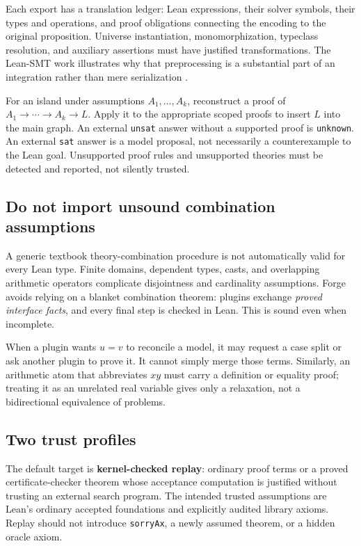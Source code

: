 \documentclass[11pt,a4paper]{article}
\newcommand{\code}[1]{\texttt{\small #1}}
\begin{document}
Each export has a translation ledger: Lean expressions, their solver symbols,
their types and operations, and proof obligations connecting the encoding to
the original proposition. Universe instantiation, monomorphization, typeclass
resolution, and auxiliary assertions must have justified transformations.
The Lean-SMT work illustrates why that preprocessing is a substantial part of
an integration rather than mere serialization \cite{lean-smt}.

For an island under assumptions $A_1,\ldots,A_k$, reconstruct a proof of
$A_1\to\cdots\to A_k\to L$. Apply it to the appropriate scoped proofs to
insert $L$ into the main graph. An external \code{unsat} answer without a
supported proof is \code{unknown}. An external \code{sat} answer is a model
proposal, not necessarily a counterexample to the Lean goal. Unsupported proof
rules and unsupported theories must be detected and reported, not silently
trusted.

\subsection{Do not import unsound combination assumptions}

A generic textbook theory-combination procedure is not automatically valid
for every Lean type. Finite domains, dependent types, casts, and overlapping
arithmetic operators complicate disjointness and cardinality assumptions.
Forge avoids relying on a blanket combination theorem: plugins exchange
\emph{proved interface facts}, and every final step is checked in Lean.
This is sound even when incomplete.

When a plugin wants $u=v$ to reconcile a model, it may request a case split or
ask another plugin to prove it. It cannot simply merge those terms. Similarly,
an arithmetic atom that abbreviates $xy$ must carry a definition or equality
proof; treating it as an unrelated real variable gives only a relaxation, not
a bidirectional equivalence of problems.

\subsection{Two trust profiles}

The default target is \textbf{kernel-checked replay}: ordinary proof terms or a
proved certificate-checker theorem whose acceptance computation is justified
without trusting an external search program. The intended trusted assumptions
are Lean's ordinary accepted foundations and explicitly audited library
axioms. Replay should not introduce \code{sorryAx}, a newly assumed theorem,
or a hidden oracle axiom.
\end{document}
